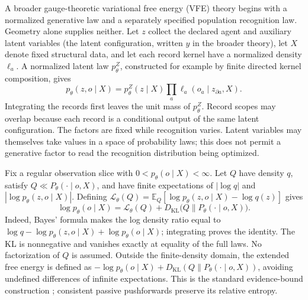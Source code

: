 \documentclass[twoside,11pt]{article}
\begin{document}
A broader gauge-theoretic variational free energy (VFE) theory begins with a normalized generative law and a separately specified population recognition law. Geometry alone supplies neither. Let $z$ collect the declared agent and auxiliary latent variables (the latent configuration, written $y$ in the broader theory), let $X$ denote fixed structural data, and let each record kernel have a normalized density $\ell_a$. A normalized latent law $p_\theta^Z$, constructed for example by finite directed kernel composition, gives
\begin{equation}
p_\theta(z,o\mid X)=p_\theta^Z(z\mid X)\prod_a\ell_a(o_a\mid z_{\partial a},X).
\label{eq:rg_bridge_joint}
\end{equation}
Integrating the records first leaves the unit mass of $p_\theta^Z$. Record scopes may overlap because each record is a conditional output of the same latent configuration. The factors are fixed while recognition varies. Latent variables may themselves take values in a space of probability laws; this does not permit a generative factor to read the recognition distribution being optimized.

Fix a regular observation slice with $0<p_\theta(o\mid X)<\infty$. Let $Q$ have density $q$, satisfy $Q\ll P_\theta(\cdot\mid o,X)$, and have finite expectations of $|\log q|$ and $|\log p_\theta(z,o\mid X)|$. Defining $\mathcal L_\theta(Q)=\mathbb E_Q[\log p_\theta(z,o\mid X)-\log q(z)]$ gives
\begin{equation}
\log p_\theta(o\mid X)=\mathcal L_\theta(Q)+D_{\mathrm{KL}}\bigl(Q\|P_\theta(\cdot\mid o,X)\bigr).
\label{eq:rg_bridge_elbo}
\end{equation}
Indeed, Bayes' formula makes the log density ratio equal to $\log q-\log p_\theta(z,o\mid X)+\log p_\theta(o\mid X)$; integrating proves the identity. The KL is nonnegative and vanishes exactly at equality of the full laws. No factorization of $Q$ is assumed. Outside the finite-density domain, the extended free energy is defined as $-\log p_\theta(o\mid X)+D_{\mathrm{KL}}(Q\|P_\theta(\cdot\mid o,X))$, avoiding undefined differences of infinite expectations. This is the standard evidence-bound construction \citep[Sec.~2.2, Eq.~14]{Blei2017}; consistent passive pushforwards preserve its relative entropy.
\end{document}

